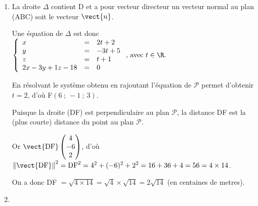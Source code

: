 \begin{enumerate}[resume]
\begin{enumerate}
En remplaçant $x, \:y$ et $z$ par leurs valeurs en fonction de $t$ dans la dernière équation on obtient :

$2(3t + 2)- 3(t + 5) + 4t + 1 - 18 = 0 \iff 6t + 4 - 3y - 15 + 4t + 1 - 18 = 0\iff $

$7t - 28 = 0 \iff 7t = 28 \iff t = 4$.

D'où les coordonnées de E en remplaçant $t$ par dans les équations de $d$ : E(14~;~9~;~17)
	\end{enumerate}
	\item %
La droite $\Delta$ contient D et a pour vecteur directeur un vecteur normal au plan (ABC) soit le vecteur $\vect{n}$.

Une équation de $\Delta$ est donc $\left\{\begin{array}{l c l}
x&=&2t+2\\y&=&-3t+5\\z&=&t+1\\
2x - 3y + 1z - 18 &=& 0
\end{array}\right.\text{, avec } t \in \R.$

En résolvant le système obtenu en rajoutant l'équation de $\mathcal{P}$ permet d'obtenir $t = 2$, d'où F$(6~;~-1~;~3)$.

Puisque la droite (DF) est perpendiculaire au plan $\mathcal{P}$, la distance DF est la (plus courte) distance du point au plan $\mathcal{P}$.

Or $\vect{\text{DF}}\begin{pmatrix}4\\-6\\2\end{pmatrix}$, d'où $\left\|\vect{\text{DF}}\right\|^2 = \text{DF}^2 = 4^2 + (-6)^2 + 2^2 = 16 + 36 + 4 = 56 = 4 \times 14$.

On a donc DF $ = \sqrt{4 \times 14} = \sqrt 4 \times \sqrt{14} = 2\sqrt{14}$ (en centaines de metres).
	
	\item %
	

\end{enumerate}
